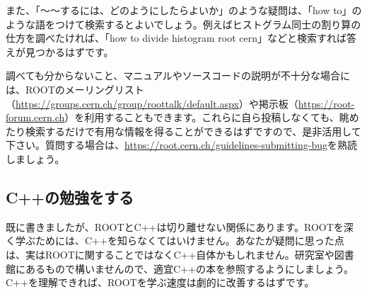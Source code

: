 また、「〜〜するには、どのようにしたらよいか」のような疑問は、「how to」のような語をつけて検索するとよいでしょう。例えばヒストグラム同士の割り算の仕方を調べたければ、「how to divide histogram root cern」などと検索すれば答えが見つかるはずです。

調べても分からないこと、マニュアルやソースコードの説明が不十分な場合には、ROOTのメーリングリスト（\url{https://groups.cern.ch/group/roottalk/default.aspx}）や掲示板（\url{https://root-forum.cern.ch}）を利用することもできます。これらに自ら投稿しなくても、眺めたり検索するだけで有用な情報を得ることができるはずですので、是非活用して下さい。質問する場合は、\url{https://root.cern.ch/guidelines-submitting-bug}を熟読しましょう。

\subsection{C++の勉強をする}
既に書きましたが、ROOTとC++は切り離せない関係にあります。ROOTを深く学ぶためには、C++を知らなくてはいけません。あなたが疑問に思った点は、実はROOTに関することではなくC++自体かもしれません。研究室や図書館にあるもので構いませんので、適宜C++の本を参照するようにしましょう。C++を理解できれば、ROOTを学ぶ速度は劇的に改善するはずです。
